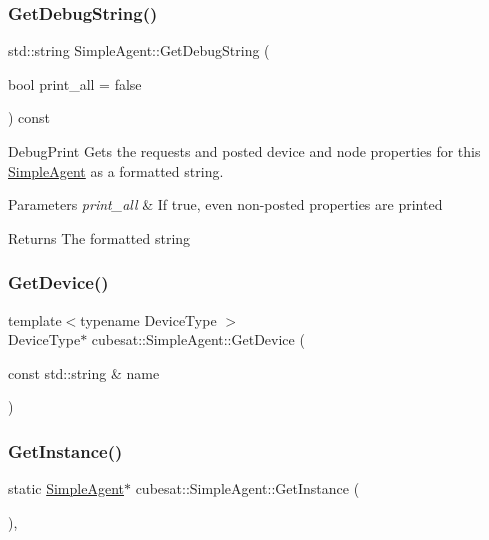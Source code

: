 \subsubsection{\texorpdfstring{Get\+Debug\+String()}{GetDebugString()}}
{\footnotesize\ttfamily std\+::string Simple\+Agent\+::\+Get\+Debug\+String (\begin{DoxyParamCaption}\item[{bool}]{print\+\_\+all = {\ttfamily false} }\end{DoxyParamCaption}) const}



Debug\+Print Gets the requests and posted device and node properties for this \hyperlink{classcubesat_1_1SimpleAgent}{Simple\+Agent} as a formatted string. 


\begin{DoxyParams}{Parameters}
{\em print\+\_\+all} & If true, even non-\/posted properties are printed \\
\hline
\end{DoxyParams}
\begin{DoxyReturn}{Returns}
The formatted string 
\end{DoxyReturn}
\mbox{\label{classcubesat_1_1SimpleAgent_a9ff584add8f93a0e135bf6a486ddad2b}} 
\subsubsection{\texorpdfstring{Get\+Device()}{GetDevice()}}
{\footnotesize\ttfamily template$<$typename Device\+Type $>$ \\
Device\+Type$\ast$ cubesat\+::\+Simple\+Agent\+::\+Get\+Device (\begin{DoxyParamCaption}\item[{const std\+::string \&}]{name }\end{DoxyParamCaption})\hspace{0.3cm}{\ttfamily [inline]}}

\mbox{\label{classcubesat_1_1SimpleAgent_a0313b247dbfab606a155e69798cfccdd}} 
\subsubsection{\texorpdfstring{Get\+Instance()}{GetInstance()}}
{\footnotesize\ttfamily static \hyperlink{classcubesat_1_1SimpleAgent}{Simple\+Agent}$\ast$ cubesat\+::\+Simple\+Agent\+::\+Get\+Instance (\begin{DoxyParamCaption}{ }\end{DoxyParamCaption})\hspace{0.3cm}{\ttfamily [inline]}, {\ttfamily [static]}}



